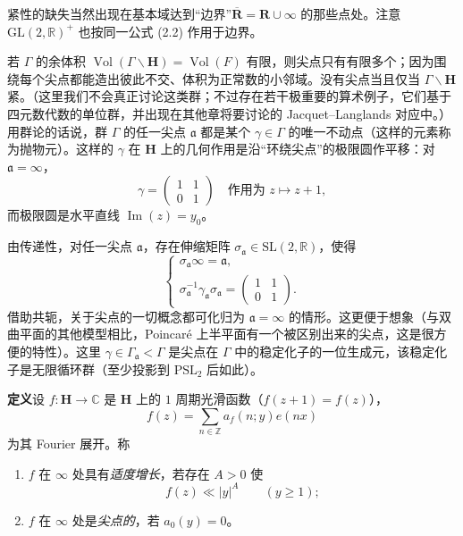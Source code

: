 紧性的缺失当然出现在基本域达到“边界”$\overline{\mathbf{R}}=\mathbf{R}\cup\infty$ 的那些点处。注意 $\mathrm{GL}(2,\mathbb{R})^{+}$ 也按同一公式 (2.2) 作用于边界。

若 $\Gamma$ 的余体积 $\operatorname{Vol}(\Gamma\backslash\mathbf{H})=\operatorname{Vol}(F)$ 有限，则尖点只有有限多个；因为围绕每个尖点都能造出彼此不交、体积为正常数的小邻域。没有尖点当且仅当 $\Gamma\backslash\mathbf{H}$ 紧。（这里我们不会真正讨论这类群；不过存在若干极重要的算术例子，它们基于四元数代数的单位群，并出现在其他章将要讨论的 Jacquet--Langlands 对应中。）用群论的话说，群 $\Gamma$ 的任一尖点 $\mathfrak{a}$ 都是某个 $\gamma\in\Gamma$ 的唯一不动点（这样的元素称为抛物元）。这样的 $\gamma$ 在 $\mathbf{H}$ 上的几何作用是沿“环绕尖点”的极限圆作平移：对 $\mathfrak{a}=\infty$，
\begin{equation}\tag{3.1}\label{c3:eq:3.1}
\gamma=\begin{pmatrix}1&1\\0&1\end{pmatrix}\quad\text{作用为 }z\mapsto z+1,
\end{equation}
而极限圆是水平直线 $\operatorname{Im}(z)=y_{0}$。

由传递性，对任一尖点 $\mathfrak{a}$，存在伸缩矩阵 $\sigma_{\mathfrak{a}}\in\mathrm{SL}(2,\mathbb{R})$，使得
\[
\begin{cases}
\sigma_{\mathfrak{a}}\infty=\mathfrak{a},\\[2pt]
\sigma_{\mathfrak{a}}^{-1}\gamma_{\mathfrak{a}}\sigma_{\mathfrak{a}}=\begin{pmatrix}1&1\\0&1\end{pmatrix}.
\end{cases}
\]
借助共轭，关于尖点的一切概念都可化归为 $\mathfrak{a}=\infty$ 的情形。这更便于想象（与双曲平面的其他模型相比，Poincaré 上半平面有一个被区别出来的尖点，这是很方便的特性）。这里 $\gamma\in\Gamma_{\mathfrak{a}}<\Gamma$ 是尖点在 $\Gamma$ 中的稳定化子的一位生成元，该稳定化子是无限循环群（至少投影到 $\mathrm{PSL}_{2}$ 后如此）。

\par\medskip\noindent\textbf{定义}\quad 设 $f\colon\mathbf{H}\to\mathbb{C}$ 是 $\mathbf{H}$ 上的 $1$ 周期光滑函数（$f(z+1)=f(z)$），
\[
f(z)=\sum_{n\in\mathbb{Z}}a_{f}(n;y)e(nx)
\]
为其 Fourier 展开。称
\begin{enumerate}[label=(\roman*),leftmargin=2.4em]
\item $f$ 在 $\infty$ 处具有\emph{适度增长}，若存在 $A>0$ 使
\[
f(z)\ll|y|^{A}\qquad(y\ge1);
\]
\item $f$ 在 $\infty$ 处是\emph{尖点的}，若 $a_{0}(y)=0$。
\end{enumerate}

